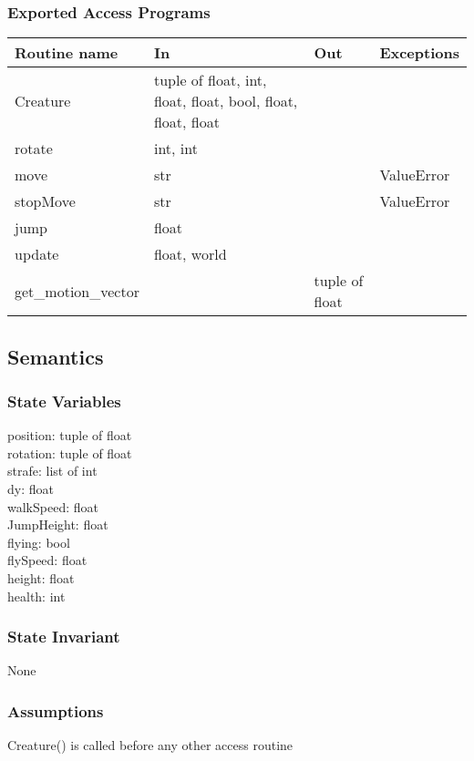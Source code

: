 \documentclass{article}
\begin{document}
\subsubsection {Exported Access Programs}
\begin{table}[!htbp]
\begin{tabular}{| l | l | l | l |}
\hline
\textbf{Routine name} & \textbf{In} & \textbf{Out} & \textbf{Exceptions}\\
\hline
Creature & tuple of float, int, float, float, bool, float, float, float & ~ & ~\\
\hline
rotate & int, int & ~& ~\\
\hline
move & str & ~& ValueError\\
\hline
stopMove & str & ~ & ValueError\\
\hline
jump & float & ~ & ~\\
\hline
update & float, world & ~ & ~\\
\hline
get\_motion\_vector & ~ & tuple of float & ~\\
\hline
\end{tabular}

\end{table}
\FloatBarrier

\subsection {Semantics}

\subsubsection {State Variables}
position: tuple of float \\
rotation: tuple of float\\
strafe: list of int \\
dy: float \\
walkSpeed: float\\
JumpHeight: float\\
flying: bool\\
flySpeed: float\\
height: float\\
health: int

\subsubsection {State Invariant}
None

\subsubsection {Assumptions}
Creature() is called before any other access routine
\end{document}
